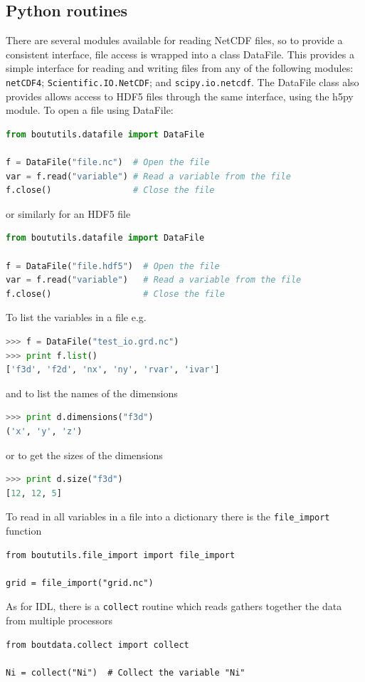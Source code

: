\documentclass[12pt]{article}
\begin{document}
\subsection{Python routines}
%
\label{sec:pythonroutines}
%
%
There are several modules available for reading NetCDF files, so to provide a
consistent interface, file access is wrapped into a class DataFile. This
provides a simple interface for reading and writing files from any of the
following modules: \texttt{netCDF4}; \texttt{Scientific.IO.NetCDF}; and
\texttt{scipy.io.netcdf}. The DataFile class also provides allows access to
HDF5 files through the same interface, using the h5py module.  To open a file
using DataFile:
%
\begin{lstlisting}[language=python,numbers=none]
from boututils.datafile import DataFile

f = DataFile("file.nc")  # Open the file
var = f.read("variable") # Read a variable from the file
f.close()                # Close the file
\end{lstlisting}
%
or similarly for an HDF5 file
%
\begin{lstlisting}[language=python,numbers=none]
from boututils.datafile import DataFile

f = DataFile("file.hdf5")  # Open the file
var = f.read("variable")   # Read a variable from the file
f.close()                  # Close the file
\end{lstlisting}
%
To list the variables in a file e.g.
%
\begin{lstlisting}[language=python,numbers=none]
>>> f = DataFile("test_io.grd.nc")
>>> print f.list()
['f3d', 'f2d', 'nx', 'ny', 'rvar', 'ivar']
\end{lstlisting}
%
and to list the names of the dimensions
%
\begin{lstlisting}[language=python,numbers=none]
>>> print d.dimensions("f3d")
('x', 'y', 'z')
\end{lstlisting}
%
or to get the sizes of the dimensions
%
\begin{lstlisting}[language=python,numbers=none]
>>> print d.size("f3d")
[12, 12, 5]
\end{lstlisting}
%
To read in all variables in a file into a dictionary there is the
\texttt{file\_import} function
%
\begin{lstlisting}
from boututils.file_import import file_import

grid = file_import("grid.nc")
\end{lstlisting}
%
As for IDL, there is a \texttt{collect} routine which reads gathers together
the data from multiple processors
%
\begin{lstlisting}
from boutdata.collect import collect

Ni = collect("Ni")  # Collect the variable "Ni"
\end{lstlisting}
%
\end{document}
